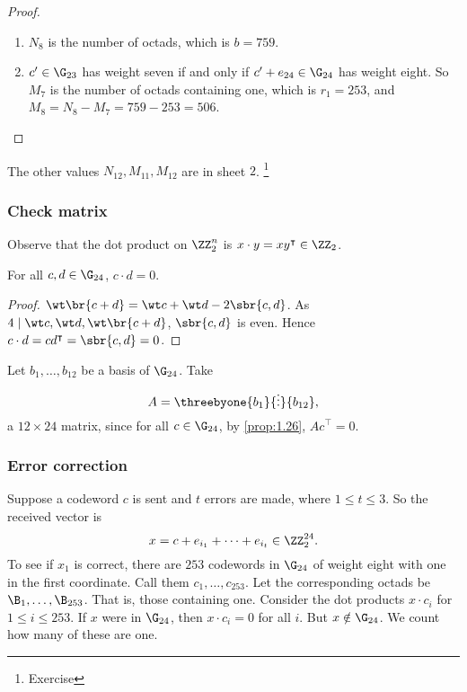 \begin{proof}
\hfill
\begin{enumerate}
\item $ N_8 $ is the number of octads, which is $ b = 759 $.
\item $ c' \in \G_{23} $ has weight seven if and only if $ c' + e_{24} \in \G_{24} $ has weight eight. So $ M_7 $ is the number of octads containing one, which is $ r_1 = 253 $, and $ M_8 = N_8 - M_7 = 759 - 253 = 506 $.
\end{enumerate}
\end{proof}

The other values $ N_{12}, M_{11}, M_{12} $ are in sheet $ 2 $. \footnote{Exercise}

\subsubsection{Check matrix}

Observe that the dot product on $ \ZZ_2^n $ is $ x \cdot y = xy^\intercal \in \ZZ_2 $.

\begin{proposition}
\label{prop:1.26}
For all $ c, d \in \G_{24} $, $ c \cdot d = 0 $.
\end{proposition}

\begin{proof}
$ \wt \br{c + d} = \wt c + \wt d - 2\sbr{c, d} $. As $ 4 \mid \wt c, \wt d, \wt \br{c + d} $, $ \sbr{c, d} $ is even. Hence $ c \cdot d = cd^\intercal = \sbr{c, d} = 0 $.
\end{proof}

Let $ b_1, \dots, b_{12} $ be a basis of $ \G_{24} $. Take
$$ A = \threebyone{b_1}{\vdots}{b_{12}}, $$
a $ 12 \times 24 $ matrix, since for all $ c \in \G_{24} $, by \ref{prop:1.26}, $ Ac^\intercal = 0 $.

\subsubsection{Error correction}

Suppose a codeword $ c $ is sent and $ t $ errors are made, where $ 1 \le t \le 3 $. So the received vector is
$$ x = c + e_{i_1} + \dots + e_{i_t} \in \ZZ_2^{24}. $$
To see if $ x_1 $ is correct, there are $ 253 $ codewords in $ \G_{24} $ of weight eight with one in the first coordinate. Call them $ c_1, \dots, c_{253} $. Let the corresponding octads be $ \B_1, \dots, \B_{253} $. That is, those containing one. Consider the dot products $ x \cdot c_i $ for $ 1 \le i \le 253 $. If $ x $ were in $ \G_{24} $, then $ x \cdot c_i = 0 $ for all $ i $. But $ x \notin \G_{24} $. We count how many of these are one.

